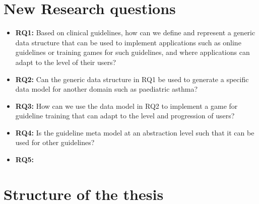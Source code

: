 \section{New Research questions}
\begin{itemize}
	\item \textbf{RQ1:} Based on clinical guidelines, how can we define and represent a generic data structure that can be used to implement applications such as online guidelines or training games for such guidelines, and where applications can adapt to the level of their users?
	\item \textbf{RQ2:} Can the generic data structure in RQ1 be used to generate a specific data model for another domain such as paediatric asthma?
	\item \textbf{RQ3:} How can we use the data model in RQ2 to implement a game for guideline training that can adapt to the level and progression  of users?
	\item \textbf{RQ4:} Is the guideline meta model at an abstraction level such that it can be used for other guidelines? 
	\item \textbf{RQ5:}
\end{itemize}
\section{Structure of the thesis}